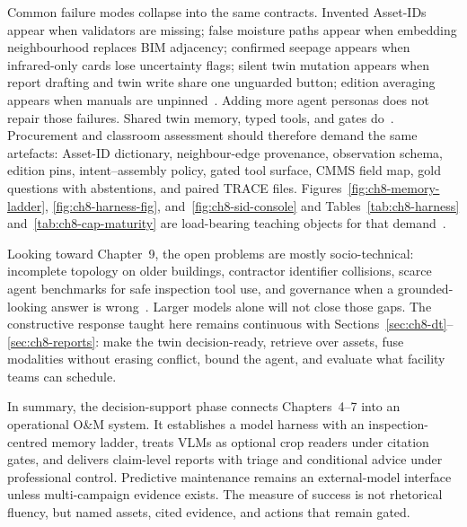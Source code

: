 Common failure modes collapse into the same contracts. Invented Asset-IDs appear when validators are missing; false moisture paths appear when embedding neighbourhood replaces BIM adjacency; confirmed seepage appears when infrared-only cards lose uncertainty flags; silent twin mutation appears when report drafting and twin write share one unguarded button; edition averaging appears when manuals are unpinned~\cite{ji2023,peng2024,lee2024ragsafety,luo2025llmdtrobot}. Adding more agent personas does not repair those failures. Shared twin memory, typed tools, and gates do~\cite{wang2024surveyagents,rawat2025llmmas,gao2026ifcagent}. Procurement and classroom assessment should therefore demand the same artefacts: Asset-ID dictionary, neighbour-edge provenance, observation schema, edition pins, intent--assembly policy, gated tool surface, CMMS field map, gold questions with abstentions, and paired TRACE files. Figures~\ref{fig:ch8-memory-ladder}, \ref{fig:ch8-harness-fig}, and~\ref{fig:ch8-sid-console} and Tables~\ref{tab:ch8-harness} and~\ref{tab:ch8-cap-maturity} are load-bearing teaching objects for that demand~\cite{yao2023react,hellin2025bimmas,buga2025llmfmsql}.

Looking toward Chapter~9, the open problems are mostly socio-technical: incomplete topology on older buildings, contractor identifier collisions, scarce agent benchmarks for safe inspection tool use, and governance when a grounded-looking answer is wrong~\cite{saka2024gptconstruction,ma2026tenquestions}. Larger models alone will not close those gaps. The constructive response taught here remains continuous with Sections~\ref{sec:ch8-dt}--\ref{sec:ch8-reports}: make the twin decision-ready, retrieve over assets, fuse modalities without erasing conflict, bound the agent, and evaluate what facility teams can schedule.

In summary, the decision-support phase connects Chapters~4--7 into an operational O\&M system. It establishes a model harness with an inspection-centred memory ladder, treats VLMs as optional crop readers under citation gates, and delivers claim-level reports with triage and conditional advice under professional control. Predictive maintenance remains an external-model interface unless multi-campaign evidence exists. The measure of success is not rhetorical fluency, but named assets, cited evidence, and actions that remain gated.
